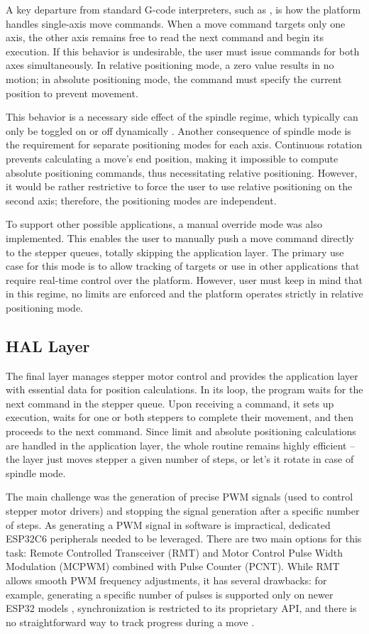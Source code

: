 A key departure from standard G-code interpreters, such as \cite{duet}, is how the platform handles single-axis move commands.
When a move command targets only one axis, the other axis remains free to read the next command and begin its execution.
If this behavior is undesirable, the user must issue commands for both axes simultaneously.
In relative positioning mode, a zero value results in no motion; in absolute positioning mode, the command must specify the current position to prevent movement.

This behavior is a necessary side effect of the spindle regime, which typically can only be toggled on or off dynamically \cite{duet}.
Another consequence of spindle mode is the requirement for separate positioning modes for each axis.
Continuous rotation prevents calculating a move’s end position, making it impossible to compute absolute positioning commands, thus necessitating relative positioning.
However, it would be rather restrictive to force the user to use relative positioning on the second axis; therefore, the positioning modes are independent.

To support other possible applications, a manual override mode was also implemented.
This enables the user to manually push a move command directly to the stepper queues, totally skipping the application layer.
The primary use case for this mode is to allow tracking of targets or use in other applications that require real-time control over the platform.
However, user must keep in mind that in this regime, no limits are enforced and the platform operates strictly in relative positioning mode.

\subsection{HAL Layer}

The final layer manages stepper motor control and provides the application layer with essential data for position calculations.
In its loop, the program waits for the next command in the stepper queue.
Upon receiving a command, it sets up execution, waits for one or both steppers to complete their movement, and then proceeds to the next command.
Since limit and absolute positioning calculations are handled in the application layer, the whole routine remains highly efficient -- the layer just moves stepper a given number of steps, or let's it rotate in case of spindle mode.

The main challenge was the generation of precise PWM signals (used to control stepper motor drivers) and stopping the signal generation after a specific number of steps.
As generating a PWM signal in software is impractical, dedicated ESP32C6 peripherals needed to be leveraged.
There are two main options for this task: Remote Controlled Transceiver (RMT) and Motor Control Pulse Width Modulation (MCPWM) combined with Pulse Counter (PCNT).
While RMT allows smooth PWM frequency adjustments, it has several drawbacks: for example, generating a specific number of pulses is supported only on newer ESP32 models \cite{gitRMT}, synchronization is restricted to its proprietary API, and there is no straightforward way to track progress during a move \cite{espRMT}.

